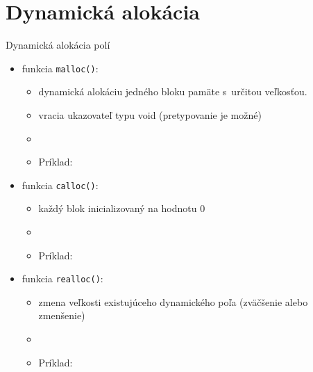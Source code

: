 \documentclass[xcolor=dvipsnames]{beamer}
\begin{document}
\section{Dynamická alokácia} \label{dyn_alloc}
\begin{frame}{Dynamická alokácia polí}

\begin{itemize}
    \item funkcia \texttt{malloc()}:
    \begin{itemize}
        \item dynamická alokáciu jedného bloku pamäte s~určitou veľkosťou. 
        \item vracia ukazovateľ typu void (pretypovanie je možné)
        \item \footnotesize\texttt{\color{blue}{ptr = (typ\_pretypovania*) malloc(velkosť\_v\_bytoch)}}
        \item Príklad: \footnotesize\texttt{\color{red}{ptr = (int*)malloc(size * sizeof(int))}}
    \end{itemize}
    \item funkcia \texttt{calloc()}:
    \begin{itemize}
        \item každý blok inicializovaný na hodnotu 0
        \item \footnotesize\texttt{\color{blue}{ptr = (typ\_pretypovania*) calloc(pocet, velkosť\_prvku)}}
        \item Príklad: \footnotesize\texttt{\color{red}{ptr = (int*) calloc(5, sizeof(float))}}
    \end{itemize}
    \item funkcia \texttt{realloc()}:
    \begin{itemize}
        \item zmena veľkosti existujúceho dynamického poľa (zväčšenie alebo zmenšenie)
        \item \footnotesize\texttt{\color{blue}{ptr = realloc(ptr, nová\_veľkosť\_v\_bytoch)}}
        \item Príklad: \footnotesize\texttt{\color{red}{ptr = realloc(ptr, 6);}}
    \end{itemize}
\end{itemize}
\end{frame}
\end{document}
